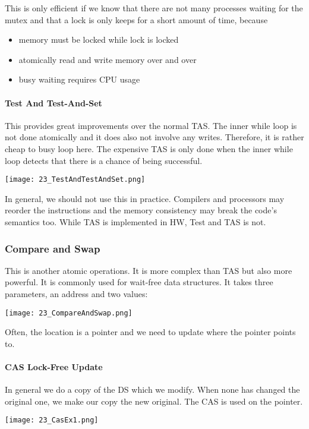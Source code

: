 This is only efficient if we know that there are not many processes waiting for the mutex and that a lock is only keeps for a short amount of time, because

\begin{itemize}
    \item memory must be locked while lock is locked
    \item atomically read and write memory over and over
    \item busy waiting requires CPU usage
\end{itemize}

\paragraph{Test And Test-And-Set}
This provides great improvements over the normal TAS. The inner while loop is not done atomically and it does also not involve any writes. Therefore, it is rather cheap to busy loop here. The expensive TAS is only done when the inner while loop detects that there is a chance of being successful.

\texttt{[image: 23\_TestAndTestAndSet.png]}

In general, we should not use this in practice. Compilers and processors may reorder the instructions and the memory consistency may break the code's semantics too. While TAS is implemented in HW, Test and TAS is not.

\subsubsection{Compare and Swap}
This is another atomic operations. It is more complex than TAS but also more powerful. It is commonly used for wait-free data structures. It takes three parameters, an address and two values:

\texttt{[image: 23\_CompareAndSwap.png]}

Often, the location is a pointer and we need to update where the pointer points to.

\paragraph{CAS Lock-Free Update}
In general we do a copy of the DS which we modify. When none has changed the original one, we make our copy the new original. The CAS is used on the pointer.

\texttt{[image: 23\_CasEx1.png]}

